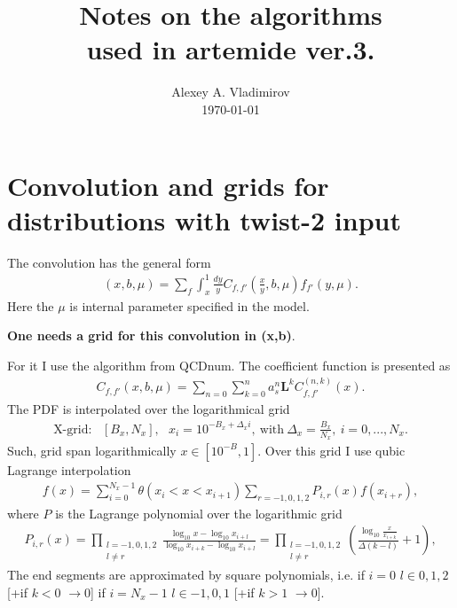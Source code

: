\documentclass[prd,nofootinbib,eqsecnum,final]{revtex4}
\renewcommand{\(}{\left(}
\renewcommand{\)}{\right)}
\renewcommand{\[}{\left[}
\renewcommand{\]}{\right]}
\begin{document}
\title{Notes on the algorithms\\ used in artemide ver.3.}
\author{Alexey A. Vladimirov \\ \today}
\noaffiliation

\maketitle

\section{Convolution and grids for distributions with twist-2 input}

The convolution has the general form
\begin{eqnarray}
[C\otimes f](x,b,\mu)=\sum_f\int_x^1 \frac{dy}{y} C_{f,f'}\(\frac{x}{y},b,\mu\)f_{f'}(y,\mu).
\end{eqnarray}
Here the $\mu$ is internal parameter specified in the model.

\textbf{One needs a grid for this convolution in (x,b)}.

For it I use the algorithm from QCDnum. The coefficient function is presented as
\begin{eqnarray}
C_{f,f'}(x,b,\mu)=\sum_{n=0}\sum_{k=0}^n a_s^n \mathbf{L}^k C^{(n,k)}_{f,f'}(x).
\end{eqnarray}
The PDF is interpolated over the logarithmical grid
\begin{eqnarray}
\text{X-grid}:~~~[B_x,N_x],~~~x_i=10^{-B_x+\Delta_x i},~\text{with}~\Delta_x=\frac{B_x}{N_x},~i=0,...,N_x.
\end{eqnarray}
Such, grid span logarithmically $x\in[10^{-B},1]$. Over this grid I use qubic Lagrange interpolation
\begin{eqnarray}
f(x)=\sum_{i=0}^{N_x-1}\theta(x_i<x<x_{i+1})\sum_{r=-1,0,1,2} P_{i,r}(x)f(x_{i+r}),
\end{eqnarray}
where $P$ is the Lagrange polynomial over the logarithmic grid
\begin{eqnarray}
P_{i,r}(x)
=\prod_{\substack{l=-1,0,1,2\\ l\neq r}}\frac{\log_{10} x-\log_{10} x_{i+l}}{\log_{10} x_{i+k}-\log_{10} x_{i+l}}
=\prod_{\substack{l=-1,0,1,2\\ l\neq r}}\(\frac{\log_{10} \frac{x}{x_{i+k}}}{\Delta(k-l)}+1\),
\end{eqnarray}
The end segments are approximated by square polynomials, i.e. if $i=0$ $l\in{0,1,2}$ [+if $k<0$ $\to0$] if $i=N_x-1$ $l\in{-1,0,1}$ [+if $k>1$ $\to0$].
\end{document}
